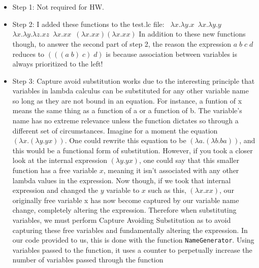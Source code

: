 \documentclass{article}
\theoremstyle{theorem}
\theoremstyle{definition}
\theoremstyle{remark}
\begin{document}
\begin{itemize}
  \item Step 1: Not required for HW.
  \item Step 2: I added these functions to the test.lc file: \texttt{
    \newline $\lambda x.\lambda y.x$
    \newline $\lambda x.\lambda y.y$
    \newline $\lambda x.\lambda y.\lambda z.x z$
    \newline $\lambda x.x x$
    \newline $(\lambda x.x x)(\lambda x.x x)$}
    \newline In addition to these new functions though, to answer the second part of step 2, the reason the expression $a\; b\; c\; d$ reduces to $(((a\; b)\;c)\;d)$ is because association between variables is always prioritized to the left!
  \item Step 3: Capture avoid substitution works due to the interesting principle that variables in lambda calculus can be substituted for any other variable name so long as they are not bound in an equation. For instance, 
        a funtion of x means the same thing as a function of a or a function of b. The variable's name has no extreme relevance unless the function dictates so through a different set of circumstances. 
        \newline \newline Imagine for a moment the equation \texttt{$(\lambda x.(\lambda y.yx))$}. One could rewrite this equation to be \texttt{$(\lambda a.(\lambda b.ba))$}, and this would be a functional form of substitution.
        However, if you took a closer look at the internal expression \texttt{$(\lambda y.yx)$}, one could say that this smaller function has a free variable $x$, meaning it isn't associated with any other lambda values in the 
        expression.
        \newline \newline Now though, if we took that internal expression and changed the $y$ variable to $x$ such as this, \texttt{$(\lambda x.xx)$}, our originally free variable x has now become captured by our variable name 
        change, completely altering the expression. Therefore when substituting variables, we must perform Capture Avoiding Substitution as to avoid capturing these free variables and fundamentally altering the expression.
        \newline \newline In our code provided to us, this is done with the function \texttt{NameGenerator}. Using variables passed to the function, it uses a counter to perpetually increase the number of variables passed through the function 

\end{itemize}
\end{document}
